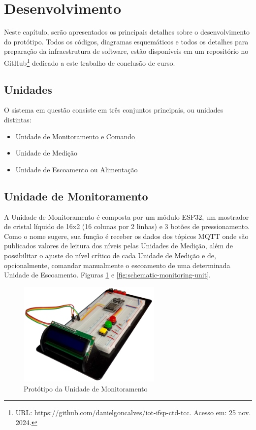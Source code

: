 \section{Desenvolvimento}
Neste capítulo, serão apresentados os principais detalhes sobre o desenvolvimento do protótipo. Todos os códigos, diagramas esquemáticos e todos os detalhes para preparação da infraestrutura de software, estão disponíveis em um repositório no GitHub\footnote{URL: https://github.com/danielgoncalves/iot-ifsp-ctd-tcc. Acesso em: 25 nov. 2024.} dedicado a este trabalho de conclusão de curso.

\subsection{Unidades}
O sistema em questão consiste em três conjuntos principais, ou unidades distintas: 
\begin{itemize}
    \item Unidade de Monitoramento e Comando
    \item Unidade de Medição
    \item Unidade de Escoamento ou Alimentação
\end{itemize}

\subsection{Unidade de Monitoramento}
A Unidade de Monitoramento é composta por um módulo ESP32, um mostrador de cristal líquido de 16x2 (16 colunas por 2 linhas) e 3 botões de pressionamento. Como o nome sugere, sua função é receber os dados dos tópicos MQTT onde são publicados valores de leitura dos níveis pelas Unidades de Medição, além de possibilitar o ajuste do nível crítico de cada Unidade de Medição e de, opcionalmente, comandar manualmente o escoamento de uma determinada Unidade de Escoamento. Figuras \ref{fig:photo-monitoring-unit} e \ref{fig:schematic-monitoring-unit}.

\begin{figure}[h!]
    \centering
    \includegraphics[width=7cm]{imagem/unidade-monitoramento.png}
    \caption{Protótipo da Unidade de Monitoramento}
    \label{fig:photo-monitoring-unit}
\end{figure}

